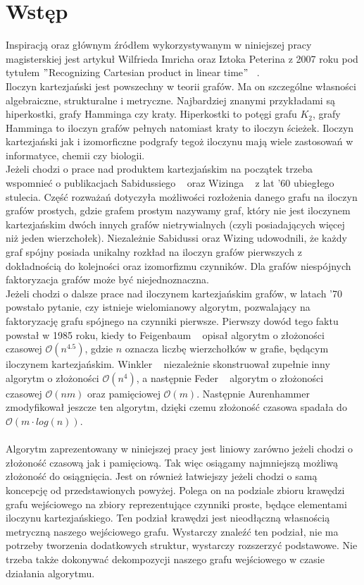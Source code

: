 \documentclass[12pt,a4paper,titlepage]{article}
\newcommand\tab[1][1cm]{\hspace*{#1}}
\begin{document}
\section{Wstęp}

Inspiracją oraz głównym źródłem wykorzystywanym w niniejszej pracy magisterskiej jest artykuł Wilfrieda Imricha oraz Iztoka Peterina z 2007 roku pod tytułem $"$Recognizing Cartesian product in linear time$"$ ~\cite{MAIN}. \\

Iloczyn kartezjański jest powszechny w teorii grafów. Ma on szczególne własności algebraiczne, strukturalne i metryczne. Najbardziej znanymi przykładami są hiperkostki, grafy Hamminga czy kraty. Hiperkostki to potęgi grafu $K_2$, grafy Hamminga to iloczyn grafów pełnych natomiast kraty to iloczyn ścieżek. Iloczyn kartezjański jak i izomorficzne podgrafy tegoż iloczynu mają wiele zastosowań w informatyce, chemii czy biologii.\\
\tab[0.6cm]Jeżeli chodzi o prace nad produktem kartezjańskim na początek trzeba wspomnieć o publikacjach Sabidussiego ~\cite{SAB} oraz Wizinga ~\cite{VIS} z lat '60 ubiegłego stulecia. Część rozważań dotyczyła możliwości rozłożenia danego grafu na iloczyn grafów prostych, gdzie grafem prostym nazywamy graf, który nie jest iloczynem kartezjańskim dwóch innych grafów nietrywialnych (czyli posiadających więcej niż jeden wierzchołek). Niezależnie Sabidussi oraz Wizing udowodnili, że każdy graf spójny posiada unikalny rozkład na iloczyn grafów pierwszych z dokładnością do kolejności oraz izomorfizmu czynników. Dla grafów niespójnych faktoryzacja grafów może być niejednoznaczna.\\
\tab[0.6cm]Jeżeli chodzi o dalsze prace nad iloczynem kartezjańskim grafów, w latach '70 powstało pytanie, czy istnieje wielomianowy algorytm, pozwalający na faktoryzację grafu spójnego na czynniki pierwsze. Pierwszy dowód tego faktu powstał w 1985 roku, kiedy to Feigenbaum ~\cite{FEI} opisał algorytm o złożoności czasowej $\mathcal{O} (n^{4.5})$, gdzie $n$ oznacza liczbę wierzchołków w grafie, będącym iloczynem kartezjańskim. Winkler ~\cite{WIN} niezależnie skonstruował zupełnie inny algorytm o złożoności $\mathcal{O} (n^{4})$, a następnie Feder ~\cite{FED} algorytm o złożoności czasowej $\mathcal{O} (nm)$ oraz pamięciowej $\mathcal{O} (m)$. Następnie Aurenhammer ~\cite{AUR} zmodyfikował jeszcze ten algorytm, dzięki czemu złożoność czasowa spadała do $\mathcal{O} (m\cdot log (n))$.\\
\\
\tab[0.6cm]Algorytm zaprezentowany w niniejszej pracy jest liniowy zarówno jeżeli chodzi o złożoność czasową jak i pamięciową. Tak więc osiągamy najmniejszą możliwą złożoność do osiągnięcia. Jest on również łatwiejszy jeżeli chodzi o samą koncepcję od przedstawionych powyżej. Polega on na podziale zbioru krawędzi grafu wejściowego na zbiory reprezentujące czynniki proste, będące elementami iloczynu kartezjańskiego. Ten podział krawędzi jest nieodłączną własnością metryczną naszego wejściowego grafu. Wystarczy znaleźć ten podział, nie ma potrzeby tworzenia dodatkowych struktur, wystarczy rozszerzyć podstawowe. Nie trzeba także dokonywać dekompozycji naszego grafu wejściowego w czasie działania algorytmu. \\
\end{document}
